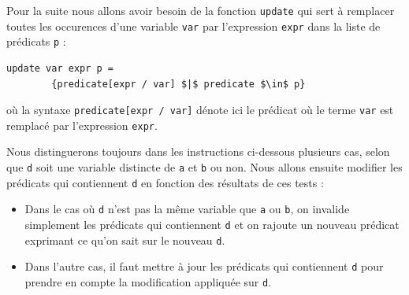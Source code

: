 \documentclass[french]{article}
\begin{document}
    Pour la suite nous allons avoir besoin de la fonction \texttt{update} qui sert à remplacer
    toutes les occurences d'une variable \texttt{var} par l'expression \texttt{expr} dans la liste de prédicats \texttt{p} :

  \begin{lstlisting}[mathescape]
    update var expr p =
        {predicate[expr / var] $|$ predicate $\in$ p}
  \end{lstlisting}

  où la syntaxe \texttt{predicate[expr / var]} dénote ici le prédicat où le terme \texttt{var} est remplacé par l'expression \texttt{expr}.

  \medbreak

  Nous distinguerons toujours dans les instructions ci-dessous plusieurs cas, selon que \texttt{d} soit une variable distincte de \texttt{a} et \texttt{b} ou non. Nous allons ensuite modifier les prédicats qui contiennent \texttt{d} en fonction des résultats de ces tests :
  \begin{itemize}
  \item Dans le cas où \texttt{d} n'est pas la même variable que \texttt{a} ou \texttt{b}, on invalide simplement les prédicats qui contiennent \texttt{d} et on rajoute un nouveau prédicat exprimant ce qu'on sait sur le nouveau \texttt{d}.
  \item Dans l'autre cas, il faut mettre à jour les prédicats qui contiennent \texttt{d} pour prendre en compte la modification appliquée sur \texttt{d}.
\end{itemize}
\end{document}
